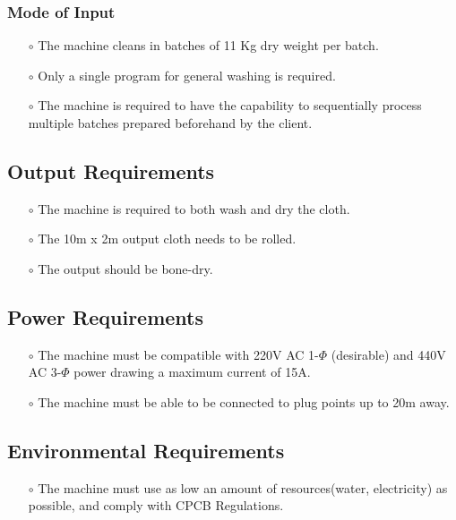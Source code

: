 \subsubsection{Mode of Input}
\begin{itemize}
    \item[$\scriptstyle\circ$] The machine cleans in batches of 11 Kg dry weight per batch.
    \item[$\scriptstyle\circ$] Only a single program for general washing is required.
    \item[$\scriptstyle\circ$]The machine is required to have the capability to sequentially process multiple batches prepared beforehand by the client. 
\end{itemize}

\subsection{Output Requirements}
\begin{itemize}
    \item[$\scriptstyle\circ$] The machine is required to both wash and dry the cloth. 
    \item [$\scriptstyle\circ$] The 10m x 2m output cloth needs to be rolled.
    \item [$\scriptstyle\circ$] The output should be bone-dry.
\end{itemize}
\subsection{Power Requirements}
\begin{itemize}
    \item[$\scriptstyle\circ$] The machine must be compatible with 220V AC 1-$\Phi$ (desirable) and 440V AC 3-$\Phi$ power drawing a maximum current of 15A.
    \item[$\scriptstyle\circ$] The machine must be able to be connected to plug points up to 20m away. 
\end{itemize}
\subsection{Environmental Requirements}
\begin{itemize}
    \item[$\scriptstyle\circ$] The machine must use as low an amount of resources(water, electricity) as possible, and comply with CPCB Regulations. 
\end{itemize}

